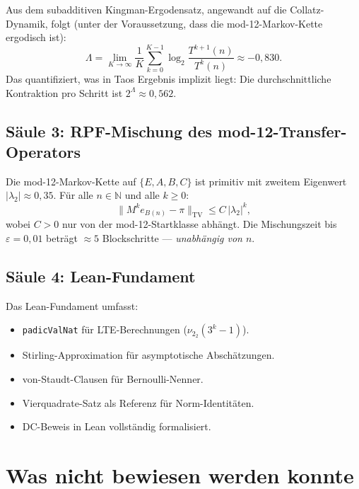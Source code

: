 \documentclass[12pt,a4paper]{article}
\newcommand{\vii}{\nu_2}
\newcommand{\N}{\mathbb{N}}
\newcommand{\TV}{\mathrm{TV}}
\begin{document}
\begin{tcolorbox}[saeulen, title={Kingman-Lyapunov-Exponent}]
Aus dem subadditiven Kingman-Ergodensatz, angewandt auf die Collatz-Dynamik,
folgt (unter der Voraussetzung, dass die mod-12-Markov-Kette ergodisch ist):
\[
  \Lambda = \lim_{K\to\infty} \frac{1}{K}\sum_{k=0}^{K-1}
  \log_2\frac{T^{k+1}(n)}{T^k(n)} \approx -0{,}830.
\]
Das quantifiziert, was in Taos Ergebnis implizit liegt: Die durchschnittliche
Kontraktion pro Schritt ist $2^{\Lambda} \approx 0{,}562$.
\end{tcolorbox}

\subsection{Säule 3: RPF-Mischung des mod-12-Transfer-Operators}

\begin{tcolorbox}[saeulen, title={Exponentielle Mischungsrate}]
Die mod-12-Markov-Kette auf $\{E, A, B, C\}$ ist primitiv mit zweitem
Eigenwert $|\lambda_2| \approx 0{,}35$. Für alle $n \in \N$ und alle
$k \geq 0$:
\[
  \bigl\|M^k e_{B(n)} - \pi\bigr\|_{\TV} \leq C\,|\lambda_2|^k,
\]
wobei $C > 0$ nur von der mod-12-Startklasse abhängt. Die Mischungszeit
bis $\varepsilon = 0{,}01$ beträgt $\approx 5$ Blockschritte ---
\emph{unabhängig von $n$}.
\end{tcolorbox}

\subsection{Säule 4: Lean-Fundament}

Das Lean-Fundament umfasst:
\begin{itemize}[nosep]
  \item \texttt{padicValNat} für LTE-Berechnungen ($\vii_2(3^k - 1)$).
  \item Stirling-Approximation für asymptotische Abschätzungen.
  \item von-Staudt-Clausen für Bernoulli-Nenner.
  \item Vierquadrate-Satz als Referenz für Norm-Identitäten.
  \item DC-Beweis in Lean vollständig formalisiert.
\end{itemize}

\section{Was nicht bewiesen werden konnte}
\label{sec:offen}
\end{document}
